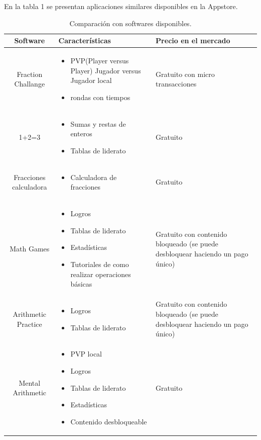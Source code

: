 \documentclass{article}
\begin{document}
En la tabla 1 se presentan aplicaciones similares disponibles en la Appstore.

\begin{table}[H]
\caption{Comparación con softwares disponibles.}
\centering
\begin{tabular}{|c|M{6cm}|M{5cm}|}
\hline
Software & Características & Precio en el mercado \\ \hline

Fraction Challange & 
\begin{itemize}
	\item PVP(Player versus Player) Jugador versus Jugador local
	\item rondas con tiempos
\end{itemize} & 
Gratuito con micro transacciones \\ \hline


1+2=3 & 
\begin{itemize}
	\item Sumas y restas de enteros
	\item Tablas de liderato 
\end{itemize}& 
Gratuito \\ \hline


Fracciones calculadora & 
\begin{itemize}
	\item Calculadora de fracciones
\end{itemize}& 
Gratuito \\ \hline


Math Games & 
\begin{itemize}
	\item Logros
	\item Tablas de liderato
	\item Estadísticas
	\item Tutoriales de como realizar operaciones básicas
\end{itemize} & 
Gratuito con contenido bloqueado (se puede desbloquear haciendo un pago único) \\ \hline

Arithmetic Practice & 
\begin{itemize}
	\item Logros
	\item Tablas de liderato
\end{itemize} & 
Gratuito con contenido bloqueado (se puede desbloquear haciendo un pago único) \\ \hline


Mental Arithmetic  & 
\begin{itemize}
	\item PVP local
	\item Logros
	\item Tablas de liderato
	\item Estadísticas
	\item Contenido desbloqueable
\end{itemize} & 
Gratuito \\ \hline

\end{tabular}
\label{tab:software}
\end{table}
\end{document}
